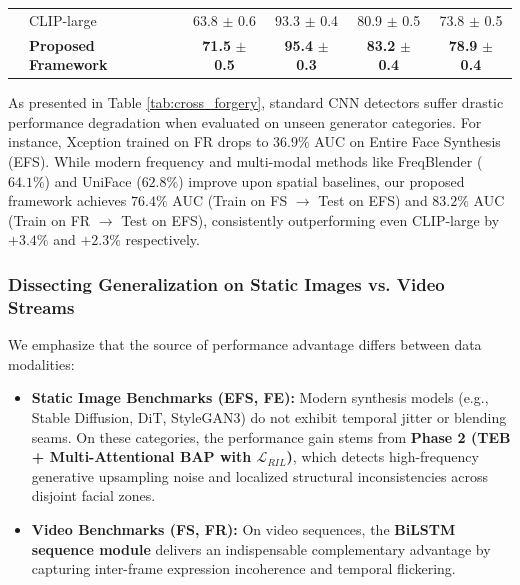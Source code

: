 \begin{table}[ht]
{\begin{tabular}{l|l|cccc}
        & CLIP-large \citep{Radford2021CLIP, Yan2024DF40} & 63.8 $\pm$ 0.6 & 93.3 $\pm$ 0.4 & 80.9 $\pm$ 0.5 & 73.8 $\pm$ 0.5 \\
        & \textbf{Proposed Framework} & \textbf{71.5} $\pm$ \textbf{0.5} & \textbf{95.4} $\pm$ \textbf{0.3} & \textbf{83.2} $\pm$ \textbf{0.4} & \textbf{78.9} $\pm$ \textbf{0.4} \\
        \bottomrule
    \end{tabular}
    }
    \par{}
\end{table}

As presented in Table \ref{tab:cross_forgery}, standard CNN detectors suffer drastic performance degradation when evaluated on unseen generator categories. For instance, Xception trained on FR drops to $36.9\%$ AUC on Entire Face Synthesis (EFS). While modern frequency and multi-modal methods like FreqBlender ($64.1\%$) and UniFace ($62.8\%$) improve upon spatial baselines, our proposed framework achieves $76.4\%$ AUC (Train on FS $\to$ Test on EFS) and $83.2\%$ AUC (Train on FR $\to$ Test on EFS), consistently outperforming even CLIP-large by $+3.4\%$ and $+2.3\%$ respectively.

\subsubsection{Dissecting Generalization on Static Images vs. Video Streams}
We emphasize that the source of performance advantage differs between data modalities:
\begin{itemize}
    \item \textbf{Static Image Benchmarks (EFS, FE):} Modern synthesis models (e.g., Stable Diffusion, DiT, StyleGAN3) do not exhibit temporal jitter or blending seams. On these categories, the performance gain stems from \textbf{Phase 2 (TEB + Multi-Attentional BAP with $\mathcal{L}_{RIL}$)}, which detects high-frequency generative upsampling noise and localized structural inconsistencies across disjoint facial zones.
    \item \textbf{Video Benchmarks (FS, FR):} On video sequences, the \textbf{BiLSTM sequence module} delivers an indispensable complementary advantage by capturing inter-frame expression incoherence and temporal flickering.
\end{itemize}

